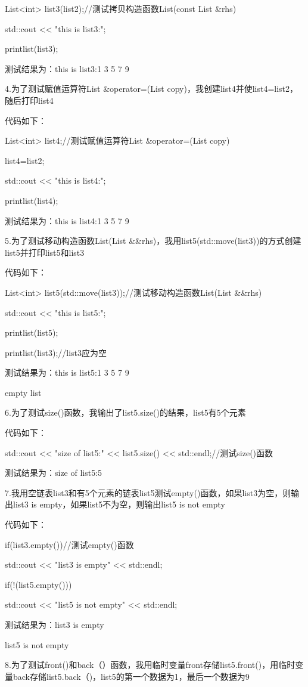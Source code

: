 \documentclass[UTF8]{ctexart}
\begin{document}
 List<int> list3(list2);//测试拷贝构造函数List(const List \&rhs)
   
    std::cout << "this is list3:";

    printlist(list3);

测试结果为：this is list3:1 3 5 7 9

4.为了测试赋值运算符List \&operator=(List copy)，我创建list4并使list4=list2，随后打印list4

代码如下：

List<int> list4;//测试赋值运算符List \&operator=(List copy)

    list4=list2;

    std::cout << "this is list4:";

    printlist(list4);

测试结果为：this is list4:1 3 5 7 9

5.为了测试移动构造函数List(List \&\&rhs)，我用list5(std::move(list3))的方式创建list5并打印list5和list3

代码如下：

List<int> list5(std::move(list3));//测试移动构造函数List(List \&\&rhs)

    std::cout << "this is list5:";

    printlist(list5);

    printlist(list3);//list3应为空

测试结果为：this is list5:1 3 5 7 9

empty list

6.为了测试size()函数，我输出了list5.size()的结果，list5有5个元素

代码如下：

 std::cout << "size of list5:" << list5.size() << std::endl;//测试size()函数

测试结果为：size of list5:5

7.我用空链表list3和有5个元素的链表list5测试empty()函数，如果list3为空，则输出list3 is empty，如果list5不为空，则输出list5 is not empty

代码如下：


if(list3.empty())//测试empty()函数

        std::cout << "list3 is empty" << std::endl;

    if(!(list5.empty()))

        std::cout << "list5 is not empty" << std::endl;

测试结果为：list3 is empty

list5 is not empty

8.为了测试front()和back（）函数，我用临时变量front存储list5.front()，用临时变量back存储list5.back（)，list5的第一个数据为1，最后一个数据为9
\end{document}
